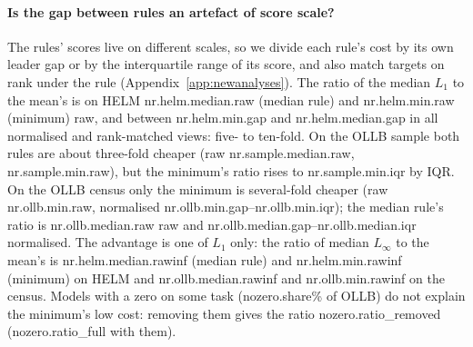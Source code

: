\paragraph{Is the gap between rules an artefact of score scale?} The rules' scores live on different scales, so we divide each rule's cost by its own leader gap or by the interquartile range of its score, and also match targets on rank under the rule (Appendix~\ref{app:newanalyses}). The ratio of the median $L_1$ to the mean's is on HELM \num{nr.helm.median.raw} (median rule) and \num{nr.helm.min.raw} (minimum) raw, and between \num{nr.helm.min.gap} and \num{nr.helm.median.gap} in all normalised and rank-matched views: five- to ten-fold. On the OLLB sample both rules are about three-fold cheaper (raw \num{nr.sample.median.raw}, \num{nr.sample.min.raw}), but the minimum's ratio rises to \num{nr.sample.min.iqr} by IQR. On the OLLB census only the minimum is several-fold cheaper (raw \num{nr.ollb.min.raw}, normalised \num{nr.ollb.min.gap}--\num{nr.ollb.min.iqr}); the median rule's ratio is \num{nr.ollb.median.raw} raw and \num{nr.ollb.median.gap}--\num{nr.ollb.median.iqr} normalised. The advantage is one of $L_1$ only: the ratio of median $L_\infty$ to the mean's is \num{nr.helm.median.rawinf} (median rule) and \num{nr.helm.min.rawinf} (minimum) on HELM and \num{nr.ollb.median.rawinf} and \num{nr.ollb.min.rawinf} on the census. Models with a zero on some task (\num{nozero.share}\% of OLLB) do not explain the minimum's low cost: removing them gives the ratio \num{nozero.ratio_removed} (\num{nozero.ratio_full} with them).




